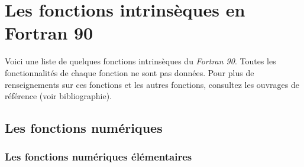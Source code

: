 \documentclass[a4paper,twoside]{article}
\begin{document}
\section{Les fonctions intrinsèques en Fortran 90}
Voici une liste de quelques fonctions intrinsèques du \emph{Fortran 90}. 
Toutes les fonctionnalités de chaque fonction ne sont pas 
données. Pour plus de renseignements sur ces fonctions et les 
autres fonctions, consultez les ouvrages de référence (voir bibliographie).
 
\subsection{Les fonctions numériques}

\subsubsection{Les fonctions numériques élémentaires}
\end{document}

